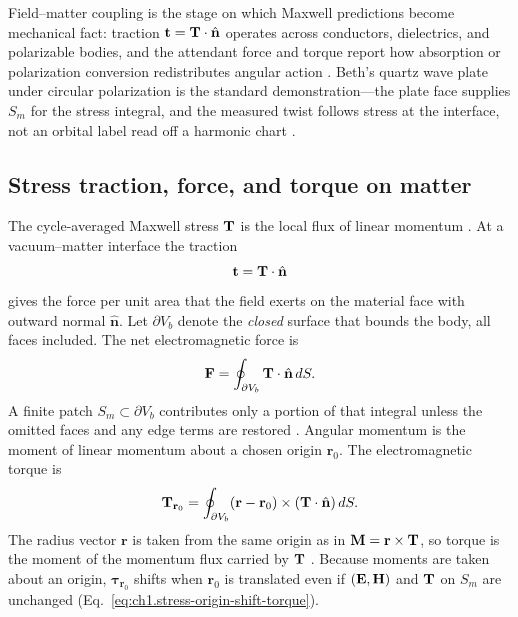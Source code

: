 Field--matter coupling is the stage on which Maxwell predictions become mechanical fact: traction $\mathbf{t}=\mathbf{T}\cdot\hat{\mathbf{n}}$ operates across conductors, dielectrics, and polarizable bodies, and the attendant force and torque report how absorption or polarization conversion redistributes angular action \cite{beth1936}. Beth's quartz wave plate under circular polarization is the standard demonstration---the plate face supplies $S_m$ for the stress integral, and the measured twist follows stress at the interface, not an orbital label read off a harmonic chart \cite{beth1936,allen1992}.

\subsection{Stress traction, force, and torque on matter}
\label{sec:ch01.5.1}

The cycle-averaged Maxwell stress $\mathbf{T}$ is the local flux of linear momentum \cite{maxwell1873,stratton1941}. At a vacuum--matter interface the traction
\begin{equation}
\label{eq:ch1.stress-traction-definition}
\mathbf{t}=\mathbf{T}\cdot\hat{\mathbf{n}}
\end{equation}
gives the force per unit area that the field exerts on the material face with outward normal $\hat{\mathbf{n}}$. Let $\partial V_b$ denote the \emph{closed} surface that bounds the body, all faces included. The net electromagnetic force is
\begin{equation}
\label{eq:ch1.stress-force-integral}
\mathbf{F}=\oint_{\partial V_b}\mathbf{T}\cdot\hat{\mathbf{n}}\,dS.
\end{equation}
A finite patch $S_m\subset\partial V_b$ contributes only a portion of that integral unless the omitted faces and any edge terms are restored \cite{stratton1941}. Angular momentum is the moment of linear momentum about a chosen origin $\mathbf{r}_0$. The electromagnetic torque is
\begin{equation}
\label{eq:ch1.stress-torque-integral}
\mathbf{T}_{\mathbf{r}_0}=\oint_{\partial V_b}(\mathbf{r}-\mathbf{r}_0)\times(\mathbf{T}\cdot\hat{\mathbf{n}})\,dS.
\end{equation}
The radius vector $\mathbf{r}$ is taken from the same origin as in $\mathbf{M}=\mathbf{r}\times\mathbf{T}$, so torque is the moment of the momentum flux carried by $\mathbf{T}$ \cite{stratton1941,beth1936}. Because moments are taken about an origin, $\boldsymbol{\tau}_{\mathbf{r}_0}$ shifts when $\mathbf{r}_0$ is translated even if $(\mathbf{E},\mathbf{H})$ and $\mathbf{T}$ on $S_m$ are unchanged (Eq.~\eqref{eq:ch1.stress-origin-shift-torque}).


